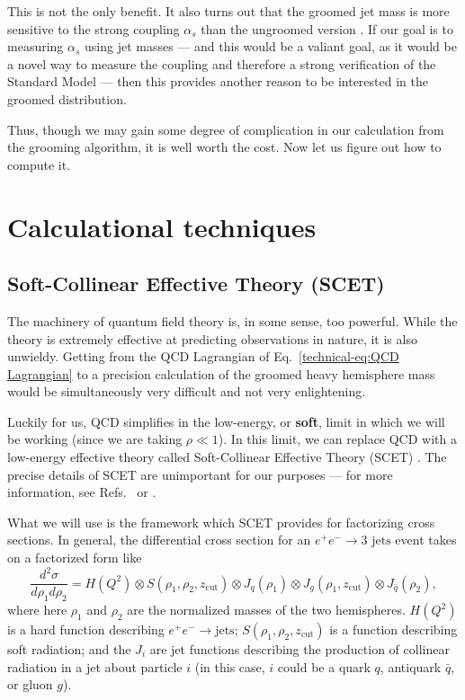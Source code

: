 \documentclass[../thesis.tex]{subfiles}
\providecommand{\zcut}{z_{\mathrm{cut}}}
\begin{document}
	This is not the only benefit. It also turns out that the groomed jet mass is more sensitive to the strong coupling $\alpha_s$ than the ungroomed version \cite{larkoski_improving_2020}. If our goal is to measuring $\alpha_s$ using jet masses --- and this would be a valiant goal, as it would be a novel way to measure the coupling and therefore a strong verification of the Standard Model --- then this provides another reason to be interested in the groomed distribution.

	Thus, though we may gain some degree of complication in our calculation from the grooming algorithm, it is well worth the cost. Now let us figure out how to compute it.


\section{Calculational techniques}
\subsection{Soft-Collinear Effective Theory (SCET)}
	The machinery of quantum field theory is, in some sense, too powerful. While the theory is extremely effective at predicting observations in nature, it is also unwieldy. Getting from the QCD Lagrangian of Eq.~\ref{technical-eq:QCD Lagrangian} to a precision calculation of the groomed heavy hemisphere mass would be simultaneously very difficult and not very enlightening.

	Luckily for us, QCD simplifies in the low-energy, or \textbf{soft}, limit in which we will be working (since we are taking $\rho \ll 1$). In this limit, we can replace QCD with a low-energy effective theory called Soft-Collinear Effective Theory (SCET) \cite{bauer_summing_2000,bauer_effective_2001,bauer_invariant_2001,bauer_soft-collinear_2002,beneke_soft-collinear_2002,beneke_multipole-expanded_2003,hill_spectator_2003}. The precise details of SCET are unimportant for our purposes --- for more information, see Refs.~\cite{schwartz_quantum_2014} or \cite{becher_introduction_2015-1}.

	What we will use is the framework which SCET provides for factorizing cross sections. In general, the differential cross section for an $e^+ e^- \to \text{3 jets}$ event takes on a factorized form like \cite{ellis_jet_2010,frye_factorization_2016}
	\begin{equation}
		\frac{d^2\sigma}{d\rho_1 d\rho_2} = H(Q^2) \otimes S(\rho_1, \rho_2, \zcut) \otimes J_q(\rho_1) \otimes J_g(\rho_1, \zcut) \otimes J_{\bar q}(\rho_2),
	\end{equation} 
	where here $\rho_1$ and $\rho_2$ are the normalized masses of the two hemispheres. $H(Q^2)$ is a hard function describing $e^+ e^- \to \text{jets}$; $S(\rho_1, \rho_2, \zcut)$ is a function describing soft radiation; and the $J_i$ are jet functions describing the production of collinear radiation in a jet about particle $i$ (in this case, $i$ could be a quark $q$, antiquark $\bar q$, or gluon $g$).
\end{document}
